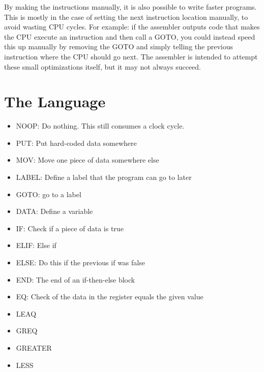 \documentclass[12pt]{article}
\begin{document}
By making the instructions manually, it is also possible to write faster programs.
This is mostly in the case of setting the next instruction location manually, to avoid wasting CPU cycles.
For example: if the assembler outputs code that makes the CPU execute an instruction and then call a GOTO,
you could instead speed this up manually by removing the GOTO and simply telling the previous instruction where
the CPU should go next. The assembler is intended to attempt these small optimizations itself, but it may not always succeed.

\section{The Language}

\begin{itemize}

\item
NOOP: Do nothing. This still consumes a clock cycle.

\item
PUT: Put hard-coded data somewhere

\item
MOV: Move one piece of data somewhere else

\item
LABEL: Define a label that the program can go to later

\item
GOTO: go to a label

\item
DATA: Define a variable

\item
IF: Check if a piece of data is true

\item
ELIF: Else if

\item
ELSE: Do this if the previous if was false

\item
END: The end of an if-then-else block

\item
EQ: Check of the data in the register equals the given value

\item
LEAQ

\item
GREQ

\item
GREATER

\item
LESS


\end{itemize}
\end{document}
